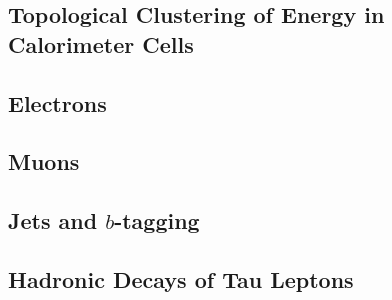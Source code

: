 



\subsection{Topological Clustering of Energy in Calorimeter Cells}

\subsection{Electrons}

\subsection{Muons}

\subsection{Jets and $b$-tagging}

\subsection{Hadronic Decays of Tau Leptons}

